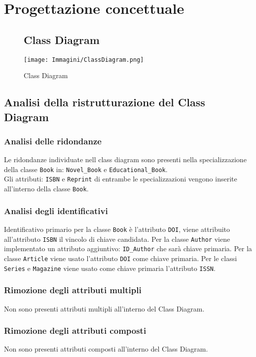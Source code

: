 \chapter{Progettazione concettuale}

\begin{figure}[hbt]
\section{Class Diagram}
\centering
\texttt{[image: Immagini/ClassDiagram.png]}
\caption{Class Diagram}
\label{fig:ClassDiagram}
\end{figure}

\section{Analisi della ristrutturazione del Class Diagram}

\subsection{Analisi delle ridondanze}

Le ridondanze individuate nell class diagram sono presenti nella specializzazione della classe \texttt{Book} in: \texttt{Novel\_Book} e \texttt{Educational\_Book}. \\ 
Gli attributi: \texttt{ISBN} e \texttt{Reprint} di entrambe le specializzazioni vengono inserite all'interno della classe \texttt{Book}.

\subsection{Analisi degli identificativi}
Identificativo primario per la classe \texttt{Book} è l'attributo \texttt{DOI}, viene attribuito all'attributo \texttt{ISBN} il vincolo di chiave candidata. 
Per la classe \texttt{Author} viene implementato un attributo aggiuntivo: \texttt{ID\_Author} che sarà chiave primaria.
Per la classe \texttt{Article} viene usato l'attributo \texttt{DOI} come chiave primaria.
Per le classi \texttt{Series} e \texttt{Magazine} viene usato come chiave primaria l'attributo \texttt{ISSN}.

\subsection{Rimozione degli attributi multipli}
Non sono presenti attributi multipli all'interno del Class Diagram.
\subsection{Rimozione degli attributi composti}
Non sono presenti attributi composti all'interno del Class Diagram.

